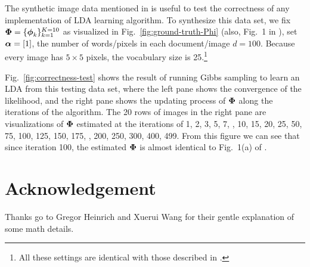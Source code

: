 The synthetic image data mentioned in \cite{lda_gibbs} is useful to
test the correctness of any implementation of LDA learning algorithm.
To synthesize this data set, we fix
$\boldsymbol{\Phi}=\{\boldsymbol{\phi}_{k}\}_{k=1}^{K=10}$ as visualized in
Fig.~\ref{fig:ground-truth-Phi} (also, Fig.~1 in \cite{lda_gibbs}),
set $\boldsymbol{\alpha}=[1]$, the number of words/pixels in each
document/image $d=100$.  Because every image has $5\times{}5$ pixels,
the vocabulary size is 25.\footnote{All these settings are identical
  with those described in \cite{lda_gibbs}.}

Fig.~\ref{fig:correctness-test} shows the result of running Gibbs
sampling to learn an LDA from this testing data set, where the left
pane shows the convergence of the likelihood, and the right pane shows
the updating process of $\boldsymbol{\Phi}$ along the iterations of the
algorithm.  The 20 rows of images in the right pane are visualizations
of $\boldsymbol{\Phi}$ estimated at the iterations of 1, 2, 3, 5, 7, , 10, 15,
20, 25, 50, 75, 100, 125, 150, 175, , 200, 250, 300, 400, 499.  From
this figure we can see that since iteration 100, the estimated
$\boldsymbol{\Phi}$ is almost identical to Fig.~1(a) of \cite{lda_gibbs}.



\section{Acknowledgement}

Thanks go to Gregor Heinrich and Xuerui Wang for their gentle
explanation of some math details.


